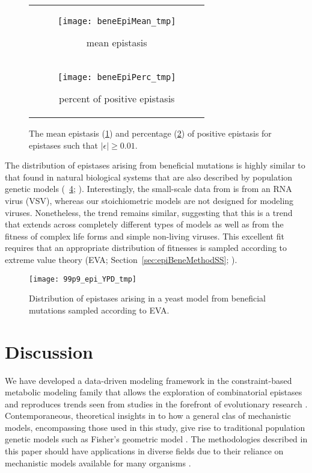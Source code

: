 \begin{figure}
\centering
\begin{tabular}{c}
\begin{subfigure}[b]{0.8\textwidth}
  \texttt{[image: beneEpiMean\_tmp]}
  \caption{mean epistasis} 
  \label{fig:beneEpiPairwise:mean}
\end{subfigure}
\\
\begin{subfigure}[b]{0.8\textwidth}
  \texttt{[image: beneEpiPerc\_tmp]}
  \caption{percent of positive epistasis}
  \label{fig:beneEpiPairwise:perc}
\end{subfigure}
\\
\end{tabular}
\caption{The mean epistasis (\ref{fig:beneEpiPairwise:mean}) and percentage
  (\ref{fig:beneEpiPairwise:perc}) of positive epistasis for epistases such
  that $\left|\epsilon\right| \ge 0.01$.}
\label{fig:beneEpiPairwise}
\end{figure}

The distribution of epistases arising from beneficial mutations is
highly similar to that found in natural biological systems that are
also described by population genetic models
(\Fig~\ref{fig:epiBeneDist}; \citep{Martin2007a}). Interestingly, the
small-scale data from \citet{Martin2007a} is from an RNA virus (VSV),
whereas our stoichiometric models are not designed for modeling
viruses. Nonetheless, the trend remains similar, suggesting that this
is a trend that extends across completely different types of models as
well as from the fitness of complex life forms and simple non-living
viruses. This excellent fit requires that an appropriate distribution
of fitnesses is sampled according to extreme value theory (EVA;
Section~\ref{sec:epiBeneMethodSS}; \citep{Orr2005, Orr2003}).


\begin{figure}
\centering
  \texttt{[image: 99p9\_epi\_YPD\_tmp]}
  \caption{Distribution of epistases arising in a yeast model from
beneficial mutations sampled according to EVA.}
  \label{fig:epiBeneDist}
\end{figure}

\section{Discussion}

We have developed a data-driven modeling framework in the
constraint-based metabolic modeling family that allows the exploration
of combinatorial epistases and reproduces trends seen from studies in
the forefront of evolutionary research \citep{Martin2007a, Chou2011,
Khan2011}. Contemporaneous, theoretical insights in to how a general
clas of mechanistic models, encompassing those used in this study,
give rise to traditional population genetic models such as Fisher's
geometric model \citep{Martin2014}.  The methodologies described in
this paper should have applications in diverse fields due to their
reliance on mechanistic models available for many organisms
\citep{Monk}.

